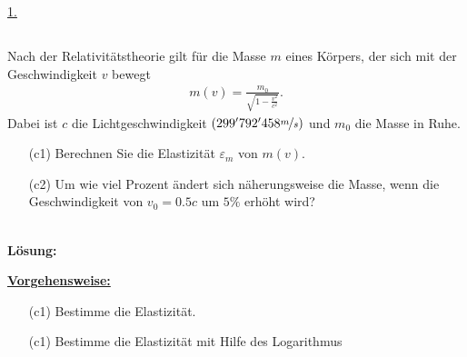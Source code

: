 \underline{1. }\\



\newpage
\subsection*{}
Nach der Relativitätstheorie gilt für die Masse $ m $ eines Körpers, der sich mit der Geschwindigkeit $ v $ bewegt
\begin{align*}
	m(v)
	=
	\frac{m_0}{\sqrt{1 - \frac{v^2}{c^2}}}.
\end{align*}
Dabei ist $ c $ die Lichtgeschwindigkeit $ (299'792'458 \nicefrac{m}{s}) $ und $ m_0 $ die Masse in Ruhe.
\begin{enumerate}
	\item[(c1)] Berechnen Sie die Elastizität $ \varepsilon_m $ von $ m(v) $.
	\item[(c2)] Um wie viel Prozent ändert sich näherungsweise die Masse, wenn die Geschwindigkeit von $ v_0 = 0.5c $ um $ 5 \% $ erhöht wird?
\end{enumerate}
\ \\
\textbf{Lösung:}
\begin{mdframed}
\underline{\textbf{Vorgehensweise:}}
\begin{enumerate}
\item[(c1)] Bestimme die Elastizität.
\item[(c1)] Bestimme die Elastizität mit Hilfe des Logarithmus
\end{enumerate}
\end{mdframed}

